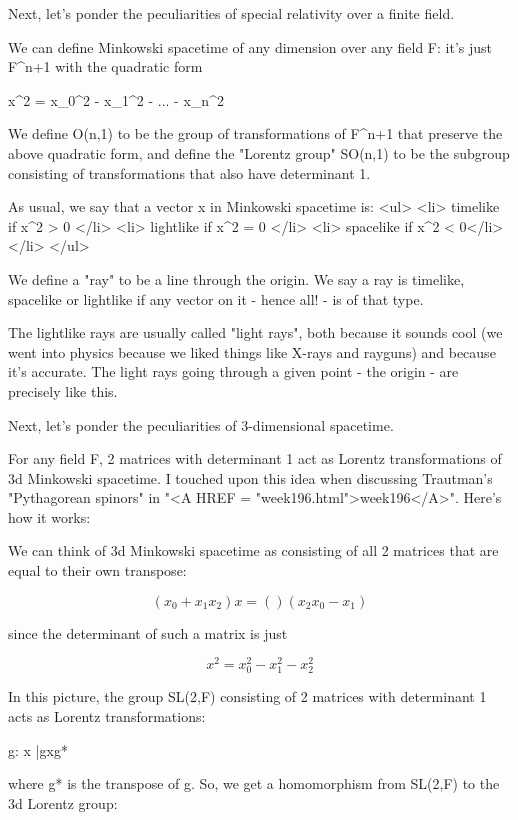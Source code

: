 Next, let's ponder the peculiarities of special relativity over a finite field.

We can define Minkowski spacetime of any dimension over any field F: 
it's just F^{n+1} with the quadratic form

x^{2} = x_{0}^{2} - x_{1}^{2} - ... - x_{n}^{2}

We define O(n,1) to be the group of transformations of F^{n+1} that preserve 
the above quadratic form, and define the "Lorentz group" 
SO(n,1) to be
the subgroup consisting of transformations that also have determinant 1.

As usual, we say that a vector x in Minkowski spacetime is:
<ul>
<li>
   timelike if  x^{2} > 0
</li>
<li>
   lightlike if x^{2} = 0
</li>
<li>
   spacelike if x^{2} < 0</li>
</li>
</ul>


We define a "ray" 
to be a line through the origin.  We say a ray is
timelike, spacelike or lightlike if any vector on it - hence all! - 
is of that type.

The lightlike rays are usually called "light rays", 
both because it sounds cool 
(we went into physics because we liked things like X-rays and rayguns) and 
because it's accurate.  The light rays going through a given point - the origin -
are precisely like this.   

Next, let's ponder the peculiarities of 3-dimensional spacetime.

For any field F, 2 matrices with determinant 1 act as Lorentz transformations
of 3d Minkowski spacetime.   I touched upon this idea when discussing Trautman's 
"Pythagorean spinors" 
in 
"<A HREF = "week196.html">week196</A>".   Here's how it works:

We can think of 3d Minkowski spacetime as consisting of all 2 matrices
that are equal to their own transpose:


$$

    ( x_{0} + x_{1}       x_{2}   )
x = (                   )
    (    x_{2}      x_{0} - x_{1} )
$$
    
since the determinant of such a matrix is just 

$$

x^{2} = x_{0}^{2} - x_{1}^{2} - x_{2}^{2}
$$
    
In this picture, the group SL(2,F) consisting of 2 matrices with determinant 1
acts as Lorentz transformations:

g: x |\to  gxg*

where g* is the transpose of g.   So, we get a homomorphism from SL(2,F)
to the 3d Lorentz group:

